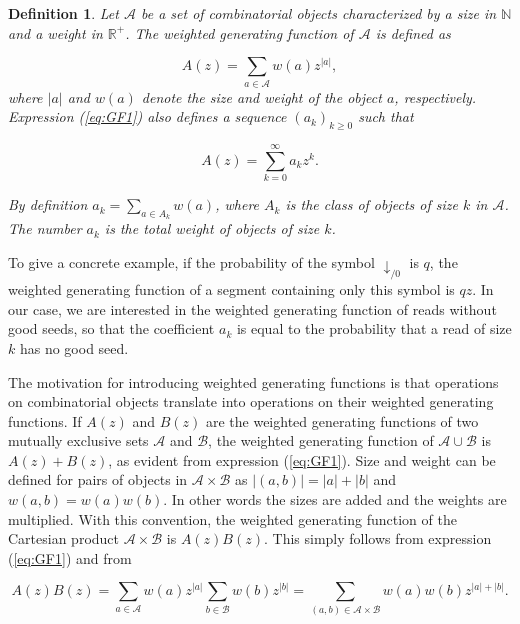 \documentclass{article}
\newtheorem{definition}{Definition}
\begin{document}
\begin{definition}
\label{def:GF}
Let $\mathcal{A}$ be a set of combinatorial objects characterized by a
size in $\mathbb{N}$ and a weight in $\mathbb{R}^+$. The weighted
generating function of $\mathcal{A}$ is defined as

\begin{equation}
\label{eq:GF1}
A(z) = \sum_{a \in \mathcal{A}} w(a) z^{|a|},
\end{equation}
where $|a|$ and $w(a)$ denote the size and weight of the object $a$,
respectively. Expression (\ref{eq:GF1}) also defines a sequence $(a_k)_{k
\geq 0}$ such that 

\begin{equation*}
A(z) = \sum_{k=0}^\infty a_k z^k.
\end{equation*}

By definition $a_k = \sum_{a \in A_k}w(a)$, where $A_k$ is the class of
objects of size $k$ in $\mathcal{A}$. The number $a_k$ is the
total weight of objects of size $k$.
\end{definition}

To give a concrete example, if the probability of the symbol
$\downarrow_{/0}$ is $q$, the weighted generating function of a segment
containing only this symbol is $qz$. In our case, we are interested in the
weighted generating function of reads without good seeds, so that the
coefficient $a_k$ is equal to the probability that a read of size $k$ has
no good seed.

The motivation for introducing weighted generating functions is that
operations on combinatorial objects translate into operations on their
weighted generating functions. If $A(z)$ and $B(z)$ are the weighted
generating functions of two mutually exclusive sets $\mathcal{A}$ and
$\mathcal{B}$, the weighted generating function of $\mathcal{A} \cup
\mathcal{B}$ is $A(z) + B(z)$, as evident from expression (\ref{eq:GF1}).
Size and weight can be defined for pairs of objects in $\mathcal{A} \times
\mathcal{B}$ as $|(a,b)| = |a| + |b|$ and $w(a,b) = w(a)w(b)$. In other
words the sizes are added and the weights are multiplied.  With this
convention, the weighted generating function of the Cartesian product
$\mathcal{A} \times \mathcal{B}$ is $A(z)B(z)$. This simply follows from
expression (\ref{eq:GF1}) and from

\begin{equation*}
A(z)B(z) =
\sum_{a\in \mathcal{A}}w(a)z^{|a|} \sum_{b\in \mathcal{B}}w(b)z^{|b|}
= \sum_{(a,b) \in \mathcal{A} \times \mathcal{B}} w(a)w(b)z^{|a|+|b|}.
\end{equation*}
\end{document}
